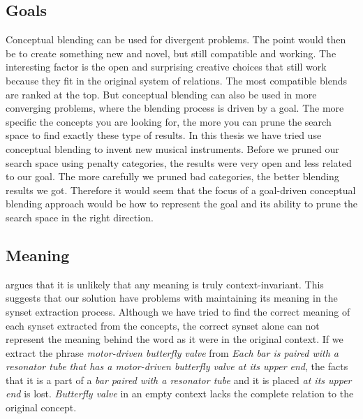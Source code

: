 \subsection{Goals}
Conceptual blending can be used for divergent problems. The point would then be to create something new and novel, but still compatible and working. The interesting factor is the open and surprising creative choices that still work because they fit in the original system of relations. The most compatible blends are ranked at the top. But conceptual blending can also be used in more converging problems, where the blending process is driven by a goal. The more specific the concepts you are looking for, the more you can prune the search space to find exactly these type of results. In this thesis we have tried use conceptual blending to invent new musical instruments. Before we pruned our search space using penalty categories, the results were very open and less related to our goal. The more carefully we pruned bad categories, the better blending results we got. Therefore it would seem that the focus of a goal-driven conceptual blending approach would be how to represent the goal and its ability to prune the search space in the right direction.


\subsection{Meaning}
\parencite{Reference5} argues that it is unlikely that any meaning is truly context-invariant. This suggests that our solution have problems with maintaining its meaning in the synset extraction process. Although we have tried to find the correct meaning of each synset extracted from the concepts, the correct synset alone can not represent the meaning behind the word as it were in the original context. If we extract the phrase \emph{motor-driven butterfly valve} from \emph{Each bar is paired with a resonator tube that has a motor-driven butterfly valve at its upper end}, the facts that it is a part of a \emph{bar paired with a resonator tube} and it is placed \emph{at its upper end} is lost. \emph{Butterfly valve} in an empty context lacks the complete relation to the original concept.



